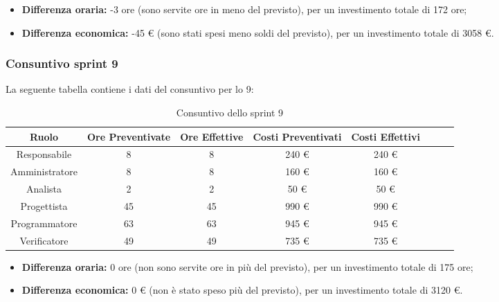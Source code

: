 \begin{itemize}
	\item \textbf{Differenza oraria:} -3 ore (sono servite ore in meno del previsto), per un investimento totale di 172 ore;
	\item \textbf{Differenza economica:} -45 \euro{} (sono stati spesi meno soldi del previsto), per un investimento totale di 3058 \euro{}.
\end{itemize}

\subsubsection{Consuntivo sprint 9}

La seguente tabella contiene i dati del consuntivo per lo  9:
\begin{table}[H]
		\begin{center}
			\setlength{\aboverulesep}{0pt}
			\setlength{\belowrulesep}{0pt}
			\setlength{\extrarowheight}{.75ex}
			\begin{tabular}{ c c c c c c c c }
				\rowcolor{AzzurroGruppo!30} 
				\textbf{Ruolo} & \textbf{Ore Preventivate} & \textbf{Ore Effettive} & \textbf{Costi Preventivati} & \textbf{Costi Effettivi}\\
				\toprule
				Responsabile   & 8 & 8 & 240 \euro{}  & 240 \euro{}\\
				Amministratore & 8 & 8 & 160 \euro{}  & 160 \euro{} \\
				Analista       & 2 & 2 & 50 \euro{}  & 50 \euro{} \\
				Progettista    & 45 & 45 & 990 \euro{} & 990 \euro{} \\
				Programmatore  & 63 & 63 & 945 \euro{}  & 945 \euro{} \\
				Verificatore   & 49 & 49 & 735 \euro{}  & 735 \euro{} \\
				\bottomrule
			\end{tabular}
			\caption{Consuntivo dello sprint 9}
		\end{center}
	\end{table}
	
\begin{itemize}
	\item \textbf{Differenza oraria:} 0 ore (non sono servite ore in più del previsto), per un investimento totale di 175 ore;
	\item \textbf{Differenza economica:} 0 \euro{} (non è stato speso più del previsto), per un investimento totale di 3120 \euro{}.
\end{itemize}
	

